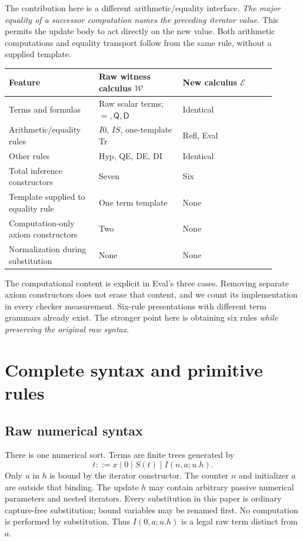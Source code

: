 \documentclass[11pt]{article}
\theoremstyle{definition}
\newcommand{\E}{\mathcal E}
\newcommand{\W}{\mathcal W}
\newcommand{\Q}{\mathsf Q}
\newcommand{\D}{\mathsf D}
\begin{document}
The contribution here is a different arithmetic/equality interface.
\emph{The major equality of a successor computation names the preceding
iterator value.} This permits the update body to act directly on the new
value. Both arithmetic computations and equality transport follow from the
same rule, without a supplied template.

\begin{center}
\begin{tabular}{@{}p{0.30\linewidth}p{0.29\linewidth}p{0.31\linewidth}@{}}
\toprule
Feature & Raw witness calculus $\W$ & New calculus $\E$\\
\midrule
Terms and formulas & Raw scalar terms; $=,\Q,\D$ & Identical\\
Arithmetic/equality rules & $I0$, $IS$, one-template Tr & Refl, Eval\\
Other rules & Hyp, QE, DE, DI & Identical\\
Total inference constructors & Seven & Six\\
Template supplied to equality rule & One term template & None\\
Computation-only axiom constructors & Two & None\\
Normalization during substitution & None & None\\
\bottomrule
\end{tabular}
\end{center}

The computational content is explicit in Eval's three cases. Removing
separate axiom constructors does not erase that content, and we count its
implementation in every checker measurement. Six-rule presentations with
different term grammars already exist. The stronger point here is obtaining
six rules \emph{while preserving the original raw syntax}.

\section{Complete syntax and primitive rules}
\label{sec:system}

\subsection{Raw numerical syntax}

There is one numerical sort. Terms are finite trees generated by
\[
 t ::= x\mid 0\mid S(t)\mid I(n,a;u.h).
\]
Only $u$ in $h$ is bound by the iterator constructor. The counter $n$ and
initializer $a$ are outside that binding. The update $h$ may contain
arbitrary passive numerical parameters and nested iterators.
Every substitution in this paper is ordinary capture-free substitution;
bound variables may be renamed first. No computation is performed by
substitution. Thus $I(0,a;u.h)$ is a legal raw term distinct from $a$.
\end{document}
